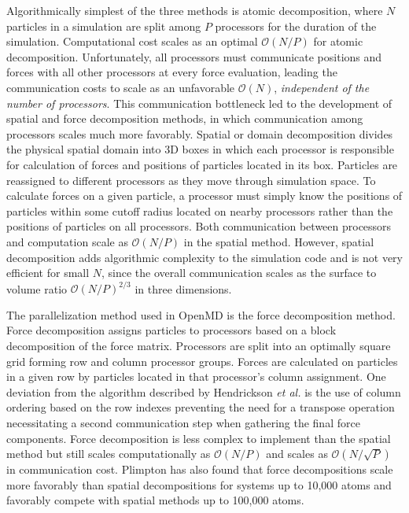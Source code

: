 \documentclass[]{book}
\begin{document}
Algorithmically simplest of the three methods is atomic decomposition,
where $N$ particles in a simulation are split among $P$ processors for
the duration of the simulation. Computational cost scales as an
optimal $\mathcal{O}(N/P)$ for atomic decomposition. Unfortunately, all
processors must communicate positions and forces with all other
processors at every force evaluation, leading the communication costs
to scale as an unfavorable $\mathcal{O}(N)$, \emph{independent of the
number of processors}. This communication bottleneck led to the
development of spatial and force decomposition methods, in which
communication among processors scales much more favorably. Spatial or
domain decomposition divides the physical spatial domain into 3D boxes
in which each processor is responsible for calculation of forces and
positions of particles located in its box. Particles are reassigned to
different processors as they move through simulation space. To
calculate forces on a given particle, a processor must simply know the
positions of particles within some cutoff radius located on nearby
processors rather than the positions of particles on all
processors. Both communication between processors and computation
scale as $\mathcal{O}(N/P)$ in the spatial method. However, spatial
decomposition adds algorithmic complexity to the simulation code and
is not very efficient for small $N$, since the overall communication
scales as the surface to volume ratio $\mathcal{O}(N/P)^{2/3}$ in
three dimensions.

The parallelization method used in {\sc OpenMD} is the force
decomposition method.\cite{hendrickson:95} Force decomposition assigns
particles to processors based on a block decomposition of the force
matrix. Processors are split into an optimally square grid forming row
and column processor groups. Forces are calculated on particles in a
given row by particles located in that processor's column
assignment. One deviation from the algorithm described by Hendrickson
{\it et al.} is the use of column ordering based on the row indexes
preventing the need for a transpose operation necessitating a second
communication step when gathering the final force components.  Force
decomposition is less complex to implement than the spatial method but
still scales computationally as $\mathcal{O}(N/P)$ and scales as
$\mathcal{O}(N/\sqrt{P})$ in communication cost. Plimpton has also
found that force decompositions scale more favorably than spatial
decompositions for systems up to 10,000 atoms and favorably compete
with spatial methods up to 100,000 atoms.\cite{plimpton95}
\end{document}
